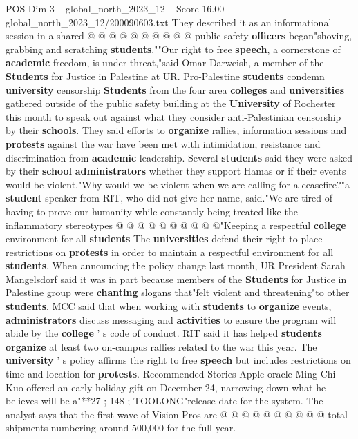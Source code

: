 \begin{textsample}{POS Dim 3 – global\_north\_2023\_12 – Score 16.00 – global\_north\_2023\_12/200090603.txt}
They described it as an informational session in a shared @ @ @ @ @ @ @ @ @ @ public safety \textbf{officers} began"shoving, grabbing and scratching \textbf{students}.""Our right to free \textbf{speech}, a cornerstone of \textbf{academic} freedom, is under threat,"said Omar Darweish, a member of the \textbf{Students} for Justice in Palestine at UR.
Pro-Palestine \textbf{students} condemn \textbf{university} censorship \textbf{Students} from the four area \textbf{colleges} and \textbf{universities} gathered outside of the public safety building at the \textbf{University} of Rochester this month to speak out against what they consider anti-Palestinian censorship by their \textbf{schools}.
They said efforts to \textbf{organize} rallies, information sessions and \textbf{protests} against the war have been met with intimidation, resistance and discrimination from \textbf{academic} leadership.
Several \textbf{students} said they were asked by their \textbf{school} \textbf{administrators} whether they support Hamas or if their events would be violent."Why would we be violent when we are calling for a ceasefire?"a \textbf{student} speaker from RIT, who did not give her name, said."We are tired of having to prove our humanity while constantly being treated like the inflammatory stereotypes @ @ @ @ @ @ @ @ @ @"Keeping a respectful \textbf{college} environment for all \textbf{students} The \textbf{universities} defend their right to place restrictions on \textbf{protests} in order to maintain a respectful environment for all \textbf{students}.
When announcing the policy change last month, UR President Sarah Mangelsdorf said it was in part because members of the \textbf{Students} for Justice in Palestine group were \textbf{chanting} slogans that"felt violent and threatening"to other \textbf{students}.
MCC said that when working with \textbf{students} to \textbf{organize} events, \textbf{administrators} discuss messaging and \textbf{activities} to ensure the program will abide by the \textbf{college} ' s code of conduct.
RIT said it has helped \textbf{students} \textbf{organize} at least two on-campus rallies related to the war this year.
The \textbf{university} ' s policy affirms the right to free \textbf{speech} but includes restrictions on time and location for \textbf{protests}.
Recommended Stories Apple oracle Ming-Chi Kuo offered an early holiday gift on December 24, narrowing down what he believes will be a"**27 ; 148 ; TOOLONG"release date for the system.
The analyst says that the first wave of Vision Pros are @ @ @ @ @ @ @ @ @ @ total shipments numbering around 500,000 for the full year.

\end{textsample}

